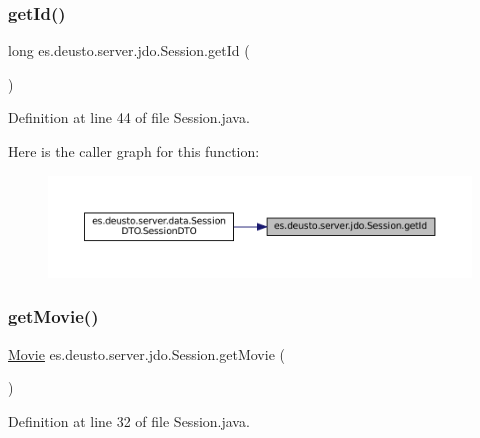 \subsubsection{\texorpdfstring{getId()}{getId()}}
{\footnotesize\ttfamily long es.\+deusto.\+server.\+jdo.\+Session.\+get\+Id (\begin{DoxyParamCaption}{ }\end{DoxyParamCaption})}



Definition at line 44 of file Session.\+java.

Here is the caller graph for this function\+:
\nopagebreak
\begin{figure}[H]
\begin{center}
\leavevmode
\includegraphics[width=350pt]{classes_1_1deusto_1_1server_1_1jdo_1_1_session_ade2b7eec9ef10a4c733aa3f4b18a8fe3_icgraph}
\end{center}
\end{figure}
\mbox{\label{classes_1_1deusto_1_1server_1_1jdo_1_1_session_afdae557964a51e2d6b037db206b344c1}} 
\subsubsection{\texorpdfstring{getMovie()}{getMovie()}}
{\footnotesize\ttfamily \mbox{\hyperlink{classes_1_1deusto_1_1server_1_1jdo_1_1_movie}{Movie}} es.\+deusto.\+server.\+jdo.\+Session.\+get\+Movie (\begin{DoxyParamCaption}{ }\end{DoxyParamCaption})}



Definition at line 32 of file Session.\+java.

